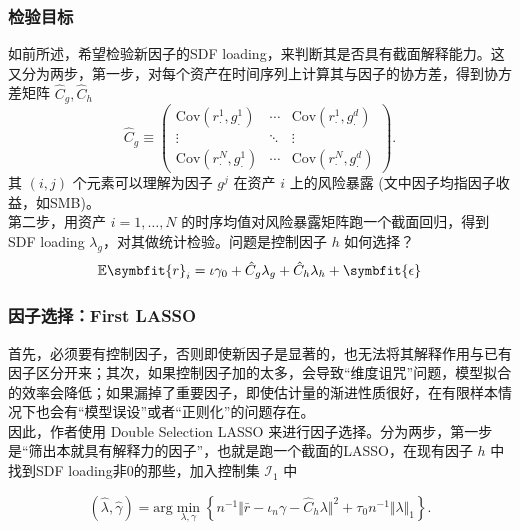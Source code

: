 \documentclass[
  UTF8,
  xcolor={dvipsnames,rgb},
  hyperref={colorlinks, citecolor=orange, linkcolor=black},
  aspectratio=169
  ]{beamer}
\begin{document}
\begin{frame}[label=main]
    \frametitle{检验目标}
    如前所述，希望检验新因子的SDF loading，来判断其是否具有截面解释能力。这又分为两步，第一步，对每个资产在时间序列上计算其与因子的协方差，得到协方差矩阵 \(\hat{C}_g, \hat{C}_h\)
    \[
        \hat{C}_{g} \equiv  \begin{pmatrix}
        \mathrm{Cov}(r_{\cdot}^{1},g_{\cdot}^{1}) & \cdots & \mathrm{Cov}(r_{\cdot}^{1},g_{\cdot}^{d}) \\
        \vdots & \ddots & \vdots \\
        \mathrm{Cov}(r_{\cdot}^{N},g_{\cdot}^{1}) & \cdots & \mathrm{Cov}(r_{\cdot}^{N},g_{\cdot}^{d})
        \end{pmatrix}
    .\]
    其 \((i,j)\) 个元素可以理解为因子 \(g^{j}\) 在资产 \(i\) 上的风险暴露 (文中因子均指因子收益，如SMB)。\hyperlink{appendix1}{}
    \\
    \vspace{1em}
    第二步，用资产 \(i=1, \ldots ,N\) 的时序均值对风险暴露矩阵跑一个截面回归，得到SDF loading \(\lambda_g\)，对其做统计检验。问题是控制因子 \(h\) 如何选择？
    \[\mathbb{E} \symbfit{r}_{i} =\iota \gamma_{0}+\hat{C}_{g}\lambda_{g}+\hat{C}_{h}\lambda_{h}+\symbfit{\epsilon}\]

\end{frame}

\begin{frame}
    \frametitle{因子选择：First LASSO}
    首先，必须要有控制因子，否则即使新因子是显著的，也无法将其解释作用与已有因子区分开来；其次，如果控制因子加的太多，会导致``维度诅咒''问题，模型拟合的效率会降低；如果漏掉了重要因子，即使估计量的渐进性质很好，在有限样本情况下也会有``模型误设''或者``正则化''的问题存在。
    \\
    \vspace{1em}
    因此，作者使用 Double Selection LASSO 来进行因子选择。分为两步，第一步是``筛出本就具有解释力的因子''，也就是跑一个截面的LASSO，在现有因子 \(h\) 中找到SDF loading非0的那些，加入控制集 \(\mathcal{I}_1\) 中

    \[( \hat{\lambda},\hat{\gamma} ) = \textrm{arg} \min_{\lambda,\gamma} \left\{ n^{-1} \Vert \bar{r}-\iota_{n}\gamma-\hat{C}_{h}\lambda \Vert^{2} + \tau_{0}n^{-1} \Vert \lambda \Vert_{1} \right\} .\]

\end{frame}
\end{document}
